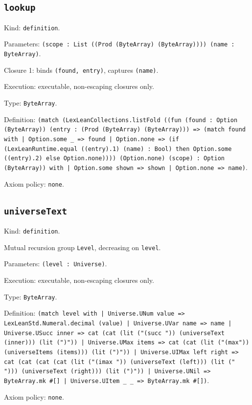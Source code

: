 \documentclass[11pt]{article}
\begin{document}
\subsection*{\texttt{lookup}}
\noindent Kind: \texttt{definition}.\par
\noindent Parameters: \texttt{(scope : List ((Prod (ByteArray) (ByteArray)))) (name : ByteArray)}.\par
\noindent Closure 1: binds \texttt{(found, entry)}, captures \texttt{(name)}.\par
\noindent Execution: executable, non-escaping closures only.\par
\noindent Type: \texttt{ByteArray}.\par
\noindent Definition: \texttt{(match (LexLeanCollections.listFold ((fun (found : Option (ByteArray)) (entry : (Prod (ByteArray) (ByteArray))) => (match found with | Option.some \_ => found | Option.none => (if (LexLeanRuntime.equal ((entry).1) (name) : Bool) then Option.some ((entry).2) else Option.none)))) (Option.none) (scope) : Option (ByteArray)) with | Option.some shown => shown | Option.none => name)}.\par
\noindent Axiom policy: \texttt{none}.\par
\subsection*{\texttt{universeText}}
\noindent Kind: \texttt{definition}.\par
\noindent Mutual recursion group \texttt{Level}, decreasing on \texttt{level}.\par
\noindent Parameters: \texttt{(level : Universe)}.\par
\noindent Execution: executable, non-escaping closures only.\par
\noindent Type: \texttt{ByteArray}.\par
\noindent Definition: \texttt{(match level with | Universe.UNum value => LexLeanStd.Numeral.decimal (value) | Universe.UVar name => name | Universe.USucc inner => cat (cat (lit ("(succ ")) (universeText (inner))) (lit (")")) | Universe.UMax items => cat (cat (lit ("(max")) (universeItems (items))) (lit (")")) | Universe.UIMax left right => cat (cat (cat (cat (lit ("(imax ")) (universeText (left))) (lit (" "))) (universeText (right))) (lit (")")) | Universe.UNil => ByteArray.mk \#[] | Universe.UItem \_ \_ => ByteArray.mk \#[])}.\par
\noindent Axiom policy: \texttt{none}.\par
\end{document}
